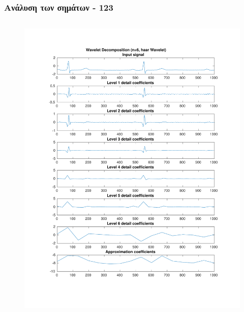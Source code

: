 \documentclass{beamer}
\begin{document}
\begin{frame}
\frametitle{Ανάλυση των σημάτων - 123}

\begin{columns}
\begin{figure}
\includegraphics[width=\textwidth]{fig/123l1_dwt1.pdf}
\end{figure}


\end{columns}
\end{frame}
\end{document}
